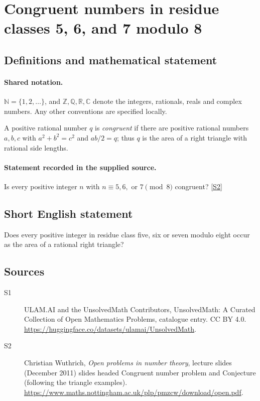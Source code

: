 \documentclass[11pt]{article}
\newcommand{\sref}[2]{\hyperlink{source:#1:#2}{[S#2]}}
\begin{document}
\section{Congruent numbers in residue classes 5, 6, and 7 modulo 8}\label{statement}

\subsection{Definitions and mathematical statement}

\paragraph{Shared notation.}$\mathbb N=\{1,2,\ldots\}$, and $\mathbb Z,\mathbb Q,\mathbb R,\mathbb C$ denote the integers, rationals, reals and complex numbers. Any other conventions are specified locally.


A positive rational number $q$ is \emph{congruent} if there are positive rational numbers $a,b,c$ with $a^2+b^2=c^2$ and $ab/2=q$; thus $q$ is the area of a right triangle with rational side lengths.
\paragraph{Statement recorded in the supplied source.}
Is every positive integer $n$ with $n\equiv5,6,$ or $7\pmod8$ congruent? \sref{statement}{2}
\subsection{Short English statement}
Does every positive integer in residue class five, six or seven modulo eight occur as the area of a rational right triangle?
\subsection{Sources}
\begin{description}
\item[\hypertarget{source:statement:1}{S1}] ULAM.AI and the UnsolvedMath Contributors, UnsolvedMath: A Curated Collection of Open Mathematics Problems, catalogue entry. CC BY 4.0. \url{https://huggingface.co/datasets/ulamai/UnsolvedMath}.
\item[\hypertarget{source:statement:2}{S2}] Christian Wuthrich, \emph{Open problems in number theory}, lecture slides (December 2011) slides headed Congruent number problem and Conjecture (following the triangle examples). \url{https://www.maths.nottingham.ac.uk/plp/pmzcw/download/open.pdf}.
\end{description}
\label{end:statement}
\end{document}
